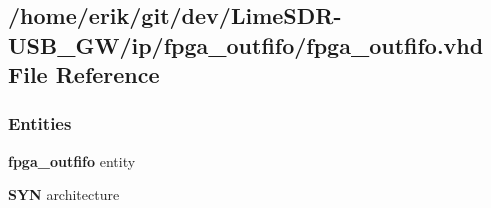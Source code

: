 \subsection{/home/erik/git/dev/\+Lime\+S\+D\+R-\/\+U\+S\+B\+\_\+\+G\+W/ip/fpga\+\_\+outfifo/fpga\+\_\+outfifo.vhd File Reference}
\label{fpga__outfifo_8vhd}
\subsubsection*{Entities}
\begin{DoxyCompactItemize}
\item 
{\bf fpga\+\_\+outfifo} entity
\item 
{\bf S\+YN} architecture
\end{DoxyCompactItemize}
